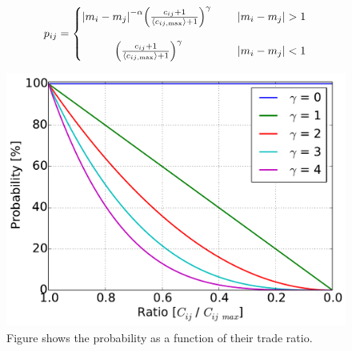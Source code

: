 \begin{align} 
p_{ij}=
\left\{\begin{matrix}
\abs{m_i-m_j}^{-\alpha}\qty(\frac{c_{ij}+1}{\langle c_{ij \mathrm{, max}}  \rangle + 1})^\gamma\ && |m_i-m_j|>1 \\ 
&&\\
\qty(\frac{c_{ij}+1}{\langle c_{ij \mathrm{, max}}\rangle +1})^\gamma &&|m_i-m_j|<1
\end{matrix}\right.\label{eq:EPICPROB2}
\end{align}

\begin{figure}[H]
\centering
\includegraphics[width=0.5\linewidth]{theory/bilder/interactions}
\caption{Figure shows the probability as a function of their trade ratio.}
\label{fig:interactions}
\end{figure}







